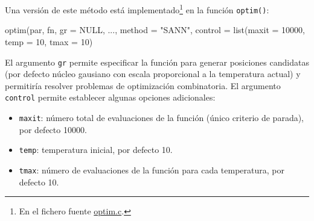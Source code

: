 \documentclass[
]{book}
\newenvironment{Shaded}{\begin{snugshade}}{\end{snugshade}}
\newcommand{\AttributeTok}[1]{\textcolor[rgb]{0.77,0.63,0.00}{#1}}
\newcommand{\ConstantTok}[1]{\textcolor[rgb]{0.00,0.00,0.00}{#1}}
\newcommand{\DecValTok}[1]{\textcolor[rgb]{0.00,0.00,0.81}{#1}}
\newcommand{\FunctionTok}[1]{\textcolor[rgb]{0.00,0.00,0.00}{#1}}
\newcommand{\NormalTok}[1]{#1}
\newcommand{\StringTok}[1]{\textcolor[rgb]{0.31,0.60,0.02}{#1}}
\theoremstyle{break}
\theoremstyle{nonumberplain}
\begin{document}
Una versión de este método está implementado\footnote{En el fichero fuente \href{https://svn.r-project.org/R/trunk/src/appl/optim.c}{optim.c}.} en la función \texttt{optim()}:

\begin{Shaded}
\begin{Highlighting}[]
\FunctionTok{optim}\NormalTok{(par, fn, }\AttributeTok{gr =} \ConstantTok{NULL}\NormalTok{, ..., }\AttributeTok{method =} \StringTok{"SANN"}\NormalTok{, }\AttributeTok{control =} \FunctionTok{list}\NormalTok{(}\AttributeTok{maxit =} \DecValTok{10000}\NormalTok{, }\AttributeTok{temp =} \DecValTok{10}\NormalTok{, }\AttributeTok{tmax =} \DecValTok{10}\NormalTok{)}
\end{Highlighting}
\end{Shaded}

El argumento \texttt{gr} permite especificar la función para generar posiciones candidatas (por defecto núcleo gausiano con escala proporcional a la temperatura actual) y permitiría resolver problemas de optimización combinatoria.
El argumento \texttt{control} permite establecer algunas opciones adicionales:

\begin{itemize}
\item
  \texttt{maxit}: número total de evaluaciones de la función (único criterio de parada), por defecto 10000.
\item
  \texttt{temp}: temperatura inicial, por defecto 10.
\item
  \texttt{tmax}: número de evaluaciones de la función para cada temperatura, por defecto 10.
\end{itemize}
\end{document}
